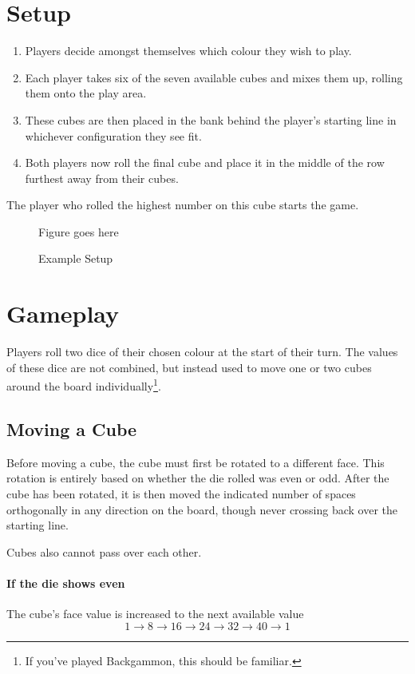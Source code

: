 \documentclass[a4paper]{article}
\begin{document}
\section{Setup}
\begin{enumerate}
    \item Players decide amongst themselves which colour they wish to play.
    \item Each player takes six of the seven available cubes and mixes them up, rolling them onto the play area.
    \item These cubes are then placed in the bank behind the player's starting line in whichever configuration they see fit.
    \item Both players now roll the final cube and place it in the middle of the row furthest away from their cubes.
\end{enumerate}
The player who rolled the highest number on this cube starts the game.

\begin{figure}[!h]
    \centering
    Figure goes here
    \caption{Example Setup}
    \label{fig:setup}
\end{figure}

\section{Gameplay}
Players roll two dice of their chosen colour at the start of their turn.
The values of these dice are not combined, but instead used to move one or two cubes around the board individually\footnote{If you've played Backgammon, this should be familiar.}.
\subsection{Moving a Cube}
Before moving a cube, the cube must first be rotated to a different face.
This rotation is entirely based on whether the die rolled was even or odd.
After the cube has been rotated, it is then moved the indicated number of spaces orthogonally in any direction on the board, though never crossing back over the starting line.

Cubes also cannot pass over each other.

\paragraph{If the die shows even} The cube's face value is increased to the next available value
$$1 \to 8 \to 16 \to 24 \to 32 \to 40 \to 1$$
\end{document}
